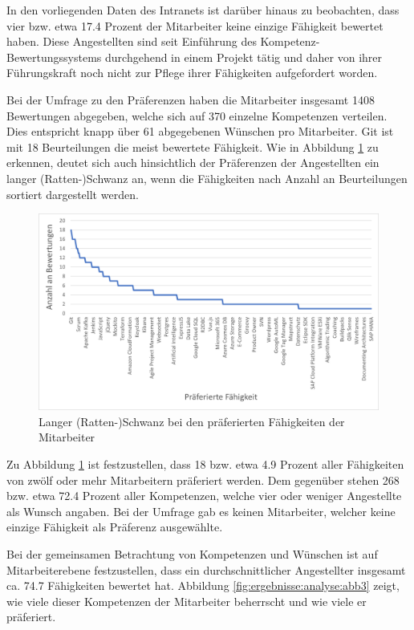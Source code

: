 In den vorliegenden Daten des Intranets ist darüber hinaus zu beobachten, dass vier bzw. etwa 17.4 Prozent der Mitarbeiter keine einzige Fähigkeit bewertet haben. Diese Angestellten sind seit Einführung des Kompetenz-Bewertungssystems durchgehend in einem Projekt tätig und daher von ihrer Führungskraft noch nicht zur Pflege ihrer Fähigkeiten aufgefordert worden.

Bei der Umfrage zu den Präferenzen haben die Mitarbeiter insgesamt 1408 Bewertungen abgegeben, welche sich auf 370 einzelne Kompetenzen verteilen. Dies entspricht knapp über 61 abgegebenen Wünschen pro Mitarbeiter. Git ist mit 18 Beurteilungen die meist bewertete Fähigkeit. Wie in Abbildung \ref{fig:ergebnisse:analyse:abb2} zu erkennen, deutet sich auch hinsichtlich der Präferenzen der Angestellten ein langer (Ratten-)Schwanz an, wenn die Fähigkeiten nach Anzahl an Beurteilungen sortiert dargestellt werden.
 
\begin{figure}[h]
	\centering
	\includegraphics[width=1\textwidth]{gfx/long-tail-praeferenzen.png}
	\caption{Langer (Ratten-)Schwanz bei den präferierten Fähigkeiten der Mitarbeiter}
	\label{fig:ergebnisse:analyse:abb2}
\end{figure}

Zu Abbildung \ref{fig:ergebnisse:analyse:abb2} ist festzustellen, dass 18 bzw. etwa 4.9 Prozent aller Fähigkeiten von zwölf oder mehr Mitarbeitern präferiert werden. Dem gegenüber stehen 268 bzw. etwa 72.4 Prozent aller Kompetenzen, welche vier oder weniger Angestellte als Wunsch angaben. Bei der Umfrage gab es keinen Mitarbeiter, welcher keine einzige Fähigkeit als Präferenz ausgewählte.

Bei der gemeinsamen Betrachtung von Kompetenzen und Wünschen ist auf Mitarbeiterebene festzustellen, dass ein durchschnittlicher Angestellter insgesamt ca. 74.7 Fähigkeiten bewertet hat. Abbildung \ref{fig:ergebnisse:analyse:abb3} zeigt, wie viele dieser Kompetenzen der Mitarbeiter beherrscht und wie viele er präferiert.

